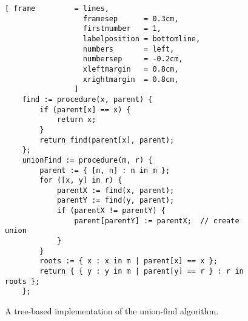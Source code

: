 \begin{figure}[!ht]
\centering
\begin{Verbatim}[ frame         = lines, 
                  framesep      = 0.3cm, 
                  firstnumber   = 1,
                  labelposition = bottomline,
                  numbers       = left,
                  numbersep     = -0.2cm,
                  xleftmargin   = 0.8cm,
                  xrightmargin  = 0.8cm,
                ]
    find := procedure(x, parent) {
        if (parent[x] == x) {
            return x;
        }
        return find(parent[x], parent);
    };
    unionFind := procedure(m, r) {
        parent := { [n, n] : n in m };  
        for ([x, y] in r) {
            parentX := find(x, parent);
            parentY := find(y, parent);
            if (parentX != parentY) {
                parent[parentY] := parentX;  // create union
            }
        }
        roots := { x : x in m | parent[x] == x };
        return { { y : y in m | parent[y] == r } : r in roots };
    };
\end{Verbatim}
\vspace*{-0.3cm}
\caption{A tree-based implementation of the union-find algorithm.}
\label{fig:union-find-tree.stlx}
\end{figure}

